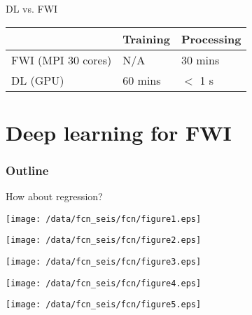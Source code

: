 \documentclass[aspectratio=43]{beamer}
\begin{document}
\begin{frame}{DL vs. FWI}
\begin{table}[]
\centering
\label{my-label}
\begin{tabular}{|l|l|l|}
\hline
                     & Training & Processing \\ \hline
FWI (MPI 30 cores)   & N/A     & 30 mins          \\ \hline
DL (GPU)             & 60 mins & $<$ 1 s         \\ \hline
\end{tabular}
\end{table}
\end{frame}
\section{Deep learning for FWI}
\begin{frame}
\frametitle{Outline}
\tableofcontents[currentsection]
\end{frame}
\begin{frame}
How about regression?
\end{frame}
\begin{frame}{}
 \centering
 \texttt{[image: /data/fcn\_seis/fcn/figure1.eps]}
\end{frame}
\begin{frame}{}
 \centering
 \texttt{[image: /data/fcn\_seis/fcn/figure2.eps]}
\end{frame}
\begin{frame}{}
 \centering
 \texttt{[image: /data/fcn\_seis/fcn/figure3.eps]}
\end{frame}
\begin{frame}{}
 \centering
 \texttt{[image: /data/fcn\_seis/fcn/figure4.eps]}
\end{frame}
\begin{frame}{}
 \centering
 \texttt{[image: /data/fcn\_seis/fcn/figure5.eps]}
\end{frame}
\end{document}
